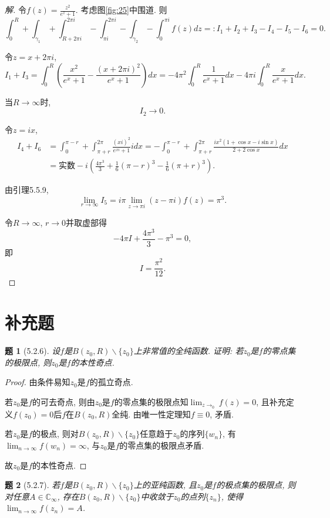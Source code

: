 \documentclass{article}[a4paper, 12pt]
\theoremstyle{mystyle}
\newtheorem{problem}{题}
\newenvironment{solution}{\begin{proof}[解]}{\end{proof}}
\begin{document}
\begin{solution}
  令\(f(z)=\frac{z^2}{e^z+1}\). 考虑图\ref{fig:25}中围道. 则\[\int_{0}^{R}+\int_{\gamma_1}+\int_{R+2\pi i}^{2\pi i}-\int_{\pi i}^{2\pi i}-\int_{\gamma_2}-\int_{0}^{\pi i} f(z)dz=:I_1+I_2+I_3-I_4-I_5-I_6=0.\]

  令\(z=x+2\pi i\), \[I_1+I_3=\int_0^R\left(\frac{x^2}{e^x+1}-\frac{(x+2\pi i)^2}{e^x+1}\right)dx=-4\pi^2\int_0^R\frac{1}{e^x+1}dx-4\pi i\int_0^R \frac{x}{e^x+1}dx.\]

  当\(R\to\infty\)时, \[I_2\to 0.\]

  令\(z=ix\), \begin{align*}I_4+I_6&=\int_{0}^{\pi-r}+\int_{\pi+r}^{2\pi} \frac{(xi)^2}{e^{xi}+1}idx=-\int_{0}^{\pi-r}+\int_{\pi+r}^{2\pi}\frac{ix^2(1+\cos x-i\sin x)}{2+2\cos x}dx\\&=\text{实数}-i\left(\frac{4\pi^3}{3}+\frac{1}{6}(\pi-r)^3-\frac{1}{6}(\pi+r)^3\right).\end{align*}

  由引理5.5.9, \[\lim_{r\to\infty}I_5=i\pi\lim_{z\to\pi i}(z-\pi i)f(z)=\pi^3.\]

  令\(R\to\infty\), \(r\to0\)并取虚部得\[-4\pi I+\frac{4\pi^3}{3}-\pi^3=0,\]
  即\[I=\frac{\pi^2}{12}. \tag*{\(\qed\)}\]
  \renewcommand{\qedsymbol}{}
\end{solution}

\section{补充题}

\begin{problem}[5.2.6]
  设\(f\)是\(B(z_0,R)\backslash\{z_0\}\)上非常值的全纯函数. 证明: 若\(z_0\)是\(f\)的零点集的极限点, 则\(z_0\)是\(f\)的本性奇点.
\end{problem}

\begin{proof}
  由条件易知\(z_0\)是\(f\)的孤立奇点.
  
  若\(z_0\)是\(f\)的可去奇点, 则由\(z_0\)是\(f\)的零点集的极限点知\(\lim_{z\to _0}f(z)=0\), 且补充定义\(f(z_0)=0\)后\(f\)在\(B(z_0,R)\)全纯. 由唯一性定理知\(f\equiv0\), 矛盾.
  
  若\(z_0\)是\(f\)的极点, 则对\(B(z_0,R)\backslash\{z_0\}\)任意趋于\(z_0\)的序列\(\{w_n\}\), 有\(\lim_{n\to\infty}f(w_n)=\infty\), 与\(z_0\)是\(f\)的零点集的极限点矛盾.
  
  故\(z_0\)是\(f\)的本性奇点.
\end{proof}

\begin{problem}[5.2.7]
  若\(f\)是\(B(z_0,R)\backslash\{z_0\}\)上的亚纯函数, 且\(z_0\)是\(f\)的极点集的极限点, 则对任意\(A\in\mathbb{C}_\infty\), 存在\(B(z_0,R)\backslash\{z_0\}\)中收敛于\(z_0\)的点列\(\{z_n\}\), 使得\(\lim_{n\to\infty}f(z_n)=A\).
\end{problem}
\end{document}
